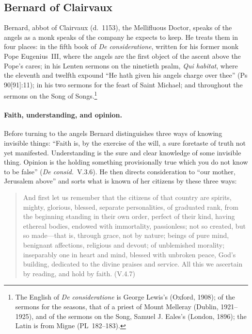 \sectionguard
\subsection{Bernard of Clairvaux}\label{sec:fa-bernard}

Bernard, abbot of Clairvaux (d.~1153), the Mellifluous Doctor, speaks of the
angels as a monk speaks of the company he expects to keep. He treats them
in four places: in the fifth book of \emph{De consideratione}, written for
his former monk Pope Eugenius~III, where the angels are the first object of
the ascent above the Pope's cares; in his Lenten sermons on the ninetieth
psalm, \emph{Qui habitat}, where the eleventh and twelfth expound ``He hath
given his angels charge over thee'' (Ps 90[91]:11); in his two sermons for
the feast of Saint Michael; and throughout the sermons on the Song of
Songs.\footnote{The English of \emph{De consideratione} is George Lewis's (Oxford,
1908); of the sermons for the seasons, that of a priest of Mount Melleray
(Dublin, 1921--1925), and of the sermons on the Song, Samuel J. Eales's
(London, 1896); the Latin is from Migne (PL~182--183).}

\paragraph{Faith, understanding, and opinion.} Before turning to the angels
Bernard distinguishes three ways of knowing invisible things: ``Faith is, by
the exercise of the will, a sure foretaste of truth not yet manifested.
Understanding is the sure and clear knowledge of some invisible thing.
Opinion is the holding something provisionally true which you do not know
to be false'' (\emph{De consid.}\ V.3.6). He then directs consideration to
``our mother, Jerusalem above'' and sorts what is known of her citizens by
these three ways:

\begin{quote}
And first let us remember that the citizens of that country are spirits,
mighty, glorious, blessed, separate personalities, of graduated rank, from
the beginning standing in their own order, perfect of their kind, having
ethereal bodies, endowed with immortality, passionless; not so created, but
so made---that is, through grace, not by nature; beings of pure mind,
benignant affections, religious and devout; of unblemished morality;
inseparably one in heart and mind, blessed with unbroken peace, God's
building, dedicated to the divine praises and service. All this we
ascertain by reading, and hold by faith. (V.4.7)
\end{quote}

